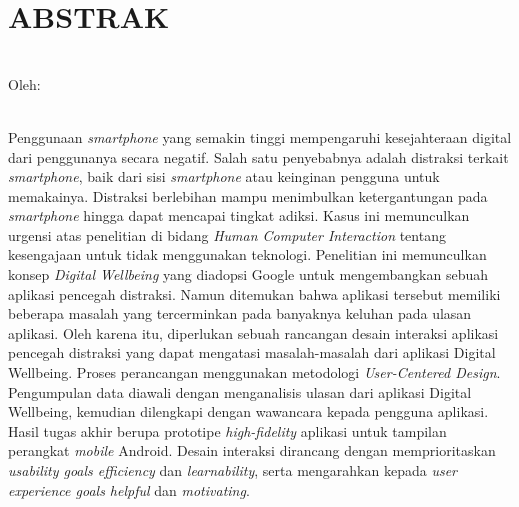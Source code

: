 \clearpage
\chapter*{ABSTRAK}

\begin{center}
  \textbf{\MakeUppercase{\thetitle}} \\[1em]
  
  Oleh: \\
  \MakeUppercase{\theauthor} \\
\end{center}

\begin{singlespace}
  Penggunaan \textit{smartphone} yang semakin tinggi mempengaruhi kesejahteraan digital dari penggunanya secara negatif.
  Salah satu penyebabnya adalah distraksi terkait \textit{smartphone}, baik dari sisi \textit{smartphone} atau keinginan pengguna untuk memakainya.
  Distraksi berlebihan mampu menimbulkan ketergantungan pada \textit{smartphone} hingga dapat mencapai tingkat adiksi.
  Kasus ini memunculkan urgensi atas penelitian di bidang \textit{Human Computer Interaction} tentang kesengajaan untuk tidak menggunakan teknologi.
  Penelitian ini memunculkan konsep \textit{Digital Wellbeing} yang diadopsi Google untuk mengembangkan sebuah aplikasi pencegah distraksi.
  Namun ditemukan bahwa aplikasi tersebut memiliki beberapa masalah yang tercerminkan pada banyaknya keluhan pada ulasan aplikasi.
  Oleh karena itu, diperlukan sebuah rancangan desain interaksi aplikasi pencegah distraksi yang dapat mengatasi masalah-masalah dari aplikasi Digital Wellbeing.
  Proses perancangan menggunakan metodologi \textit{User-Centered Design}.
  Pengumpulan data diawali dengan menganalisis ulasan dari aplikasi Digital Wellbeing, kemudian dilengkapi dengan wawancara kepada pengguna aplikasi.
  Hasil tugas akhir berupa prototipe \textit{high-fidelity} aplikasi untuk tampilan perangkat \textit{mobile} Android.
  Desain interaksi dirancang dengan memprioritaskan \textit{usability goals efficiency} dan \textit{learnability}, serta mengarahkan kepada \textit{user experience goals helpful} dan \textit{motivating}.

\end{singlespace}
